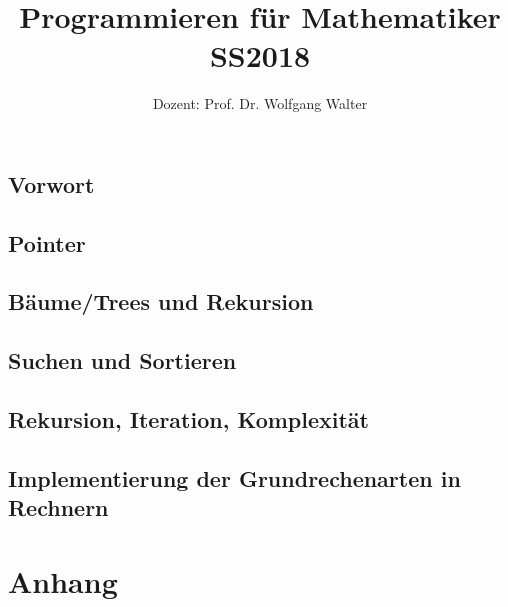 \documentclass[ngerman,a4paper,order=firstname]{../../texmf/tex/latex/mathscript/mathscript}
\title{\textbf{Programmieren für Mathematiker SS2018}}
\author{Dozent: Prof. Dr. Wolfgang Walter}
\begin{document}
\pagestyle{plain}

\maketitle

\hypertarget{tocpage}{}
\tableofcontents
{}

\pagebreak
{}
\pagestyle{fancy}

\chapter*{Vorwort}


\chapter{Pointer}





\chapter{Bäume/Trees und Rekursion}


\chapter{Suchen und Sortieren}









\chapter{Rekursion, Iteration, Komplexität}


\chapter{Implementierung der Grundrechenarten in Rechnern}




\part*{Anhang}
\appendix


\printindex
\end{document}
